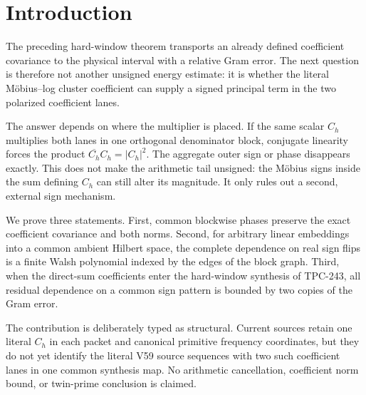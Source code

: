 \section{Introduction}

The preceding hard-window theorem transports an already defined coefficient
covariance to the physical interval with a relative Gram error.  The next
question is therefore not another unsigned energy estimate: it is whether the
literal Möbius--log cluster coefficient can supply a signed principal term in
the two polarized coefficient lanes.

The answer depends on where the multiplier is placed.  If the same scalar
$C_h$ multiplies both lanes in one orthogonal denominator block, conjugate
linearity forces the product $\overline{C_h}C_h=|C_h|^2$.  The aggregate outer
sign or phase disappears exactly.  This does not make the arithmetic tail
unsigned: the Möbius signs inside the sum defining $C_h$ can still alter its
magnitude.  It only rules out a second, external sign mechanism.

We prove three statements.  First, common blockwise phases preserve the exact
coefficient covariance and both norms.  Second, for arbitrary linear
embeddings into a common ambient Hilbert space, the complete dependence on real
sign flips is a finite Walsh polynomial indexed by the edges of the block
graph.  Third, when the direct-sum coefficients enter the hard-window synthesis
of TPC-243, all residual dependence on a common sign pattern is bounded by two
copies of the Gram error.

The contribution is deliberately typed as structural.  Current sources retain
one literal $C_h$ in each packet and canonical primitive frequency coordinates,
but they do not yet identify the literal V59 source sequences with two such
coefficient lanes in one common synthesis map.  No arithmetic cancellation,
coefficient norm bound, or twin-prime conclusion is claimed.
